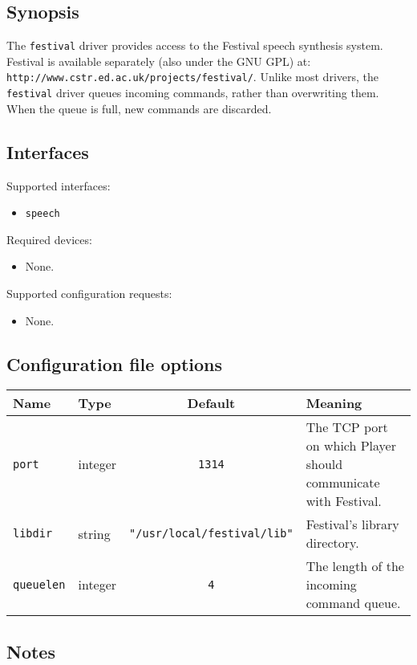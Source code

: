 \subsection*{Synopsis}
The {\tt festival} driver provides access to the Festival speech synthesis
system.  Festival is available separately (also under the GNU GPL) at:
\verb+http://www.cstr.ed.ac.uk/projects/festival/+.  Unlike most drivers, the
{\tt festival} driver queues incoming commands, rather than overwriting them.
When the queue is full, new commands are discarded.

\subsection*{Interfaces}

\noindent Supported interfaces:

\begin{itemize}
\item {\tt speech}
\end{itemize}

\noindent Required devices:
\begin{itemize}
\item None.
\end{itemize}

\noindent Supported configuration requests:
\begin{itemize}
\item None.
\end{itemize}


\subsection*{Configuration file options}

\begin{center}
{\small \begin{tabularx}{\columnwidth}{|l|l|c|X|}
\hline
Name & Type & Default & Meaning\\
\hline
{\tt port} & integer & {\tt 1314} & The TCP port on which Player should
communicate with Festival.\\
{\tt libdir} & string & {\tt "/usr/local/festival/lib"} & Festival's library
directory.\\
{\tt queuelen} & integer & {\tt 4} & The length of the incoming command
queue.\\
\hline
\end{tabularx}}
\end{center}

\subsection*{Notes}
